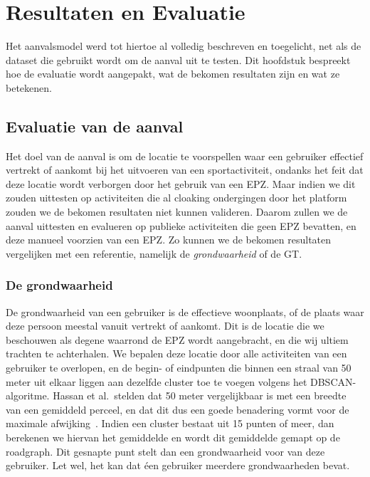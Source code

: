 \chapter{Resultaten en Evaluatie}
Het aanvalsmodel werd tot hiertoe al volledig beschreven en toegelicht, net als
de dataset die gebruikt wordt om de aanval uit te testen. Dit hoofdstuk
bespreekt hoe de evaluatie wordt aangepakt, wat de bekomen resultaten zijn en
wat ze betekenen.

\section{Evaluatie van de aanval}
Het doel van de aanval is om de locatie te voorspellen waar een gebruiker
effectief vertrekt of aankomt bij het uitvoeren van een sportactiviteit,
ondanks het feit dat deze locatie wordt verborgen door het gebruik van een
\ac{EPZ}. Maar indien we dit zouden uittesten op activiteiten die al cloaking
ondergingen door het platform zouden we de bekomen resultaten niet kunnen
valideren. Daarom zullen we de aanval uittesten en evalueren op publieke
activiteiten die geen \ac{EPZ} bevatten, en deze manueel voorzien van een
\ac{EPZ}. Zo kunnen we de bekomen resultaten vergelijken met een referentie,
namelijk de \textit{grondwaarheid} of de \ac{GT}.

\subsection{De grondwaarheid}\label{sec:groundtruth}
De grondwaarheid van een gebruiker is de effectieve woonplaats, of de plaats
waar deze persoon meestal vanuit vertrekt of aankomt. Dit is de locatie die we
beschouwen als degene waarrond de \ac{EPZ} wordt aangebracht, en die wij ultiem
trachten te achterhalen. We bepalen deze locatie door alle activiteiten van een
gebruiker te overlopen, en de begin- of eindpunten die binnen een straal van 50
meter uit elkaar liggen aan dezelfde cluster toe te voegen volgens het
\ac{DBSCAN}-algoritme. Hassan et al.\ stelden dat 50 meter vergelijkbaar is met
een breedte van een gemiddeld perceel, en dat dit dus een goede benadering
vormt voor de maximale afwijking~\cite{sec18has3:online, Verdonck_2022}. Indien
een cluster bestaat uit 15 punten of meer, dan berekenen we hiervan het
gemiddelde en wordt dit gemiddelde gemapt op de roadgraph. Dit gesnapte punt
stelt dan een grondwaarheid voor van deze gebruiker. Let wel, het kan dat éen
gebruiker meerdere grondwaarheden bevat.


